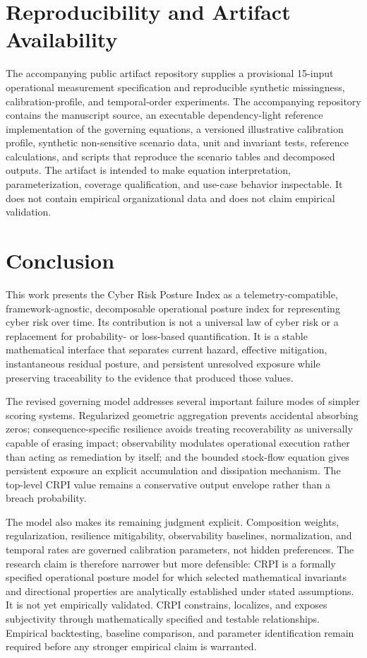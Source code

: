 \documentclass[11pt]{article}
\begin{document}
\section{Reproducibility and Artifact Availability}
\label{sec:artifacts}
The accompanying public artifact repository supplies a provisional 15-input operational measurement specification and reproducible synthetic missingness, calibration-profile, and temporal-order experiments.
The accompanying repository contains the manuscript source, an executable dependency-light
reference implementation of the governing equations, a versioned illustrative calibration
profile, synthetic non-sensitive scenario data, unit and invariant tests, reference
calculations, and scripts that reproduce the scenario tables and decomposed outputs. The
artifact is intended to make equation interpretation, parameterization, coverage
qualification, and use-case behavior inspectable. It does not contain empirical
organizational data and does not claim empirical validation.

\section{Conclusion}
\label{sec:conclusion}
This work presents the Cyber Risk Posture Index as a telemetry-compatible,
framework-agnostic, decomposable operational posture index for representing cyber risk
over time. Its contribution is not a universal law of cyber risk or a replacement for
probability- or loss-based quantification. It is a stable mathematical interface that
separates current hazard, effective mitigation, instantaneous residual posture, and
persistent unresolved exposure while preserving traceability to the evidence that
produced those values.

The revised governing model addresses several important failure modes of simpler
scoring systems. Regularized geometric aggregation prevents accidental absorbing zeros;
consequence-specific resilience avoids treating recoverability as universally capable
of erasing impact; observability modulates operational execution rather than acting as
remediation by itself; and the bounded stock-flow equation gives persistent exposure an
explicit accumulation and dissipation mechanism. The top-level CRPI value remains a
conservative output envelope rather than a breach probability.

The model also makes its remaining judgment explicit. Composition weights,
regularization, resilience mitigability, observability baselines, normalization, and
temporal rates are governed calibration parameters, not hidden preferences. The
research claim is therefore narrower but more defensible: CRPI is a formally specified
operational posture model for which selected mathematical invariants and directional
properties are analytically established under stated assumptions. It is not yet
empirically validated. CRPI constrains, localizes, and exposes subjectivity through
mathematically specified and testable relationships. Empirical backtesting, baseline
comparison, and parameter identification remain required before any stronger empirical
claim is warranted.
\end{document}
